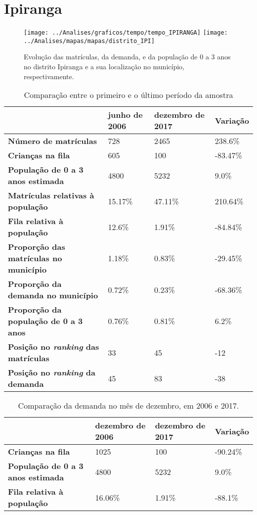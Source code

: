 \section{Ipiranga}
\begin{figure}[H]
	\centering
	\texttt{[image: ../Analises/graficos/tempo/tempo\_IPIRANGA]}
	\texttt{[image: ../Analises/mapas/mapas/distrito\_IPI]}
	\caption{Evolução das matrículas, da demanda, e da população de 0 a 3 anos no distrito Ipiranga e a sua localização no município, respectivamente.}
\end{figure}
\begin{table}[H]
	\begin{tabular}{|l|l|l|l|}
		\hline
		\textbf{}                                      & \textbf{junho de 2006}       & \textbf{dezembro de 2017}    & \textbf{Variação} \\ \hline
		\textbf{Número de matrículas}                  & 728 & 2465 & 238.6\% \\ \hline
		\textbf{Crianças na fila}                      & 605 & 100 & -83.47\% \\ \hline
		\textbf{População de 0 a 3 anos estimada}      & 4800 & 5232 & 9.0\% \\ \hline
		\textbf{Matrículas relativas à população}      & 15.17\% & 47.11\% & 210.64\% \\ \hline
		\textbf{Fila relativa à população}             & 12.6\% & 1.91\% & -84.84\% \\ \hline
		\textbf{Proporção das matrículas no município} & 1.18\% & 0.83\% & -29.45\% \\ \hline
		\textbf{Proporção da demanda no município}     & 0.72\% & 0.23\% & -68.36\% \\ \hline
		\textbf{Proporção da população de 0 a 3 anos}  & 0.76\% & 0.81\% & 6.2\% \\ \hline
		\textbf{Posição no \textit{ranking} das matrículas}     & 33 & 45 & -12 \\ \hline
		\textbf{Posição no \textit{ranking} da demanda}         & 45 & 83 & -38 \\ \hline
	\end{tabular}
	\caption{Comparação entre o primeiro e o último período da amostra}
\end{table}
\begin{table}[H]
	\begin{tabular}{|l|l|l|l|}
		\hline
		\textbf{}                                 & \textbf{dezembro de 2006} & \textbf{dezembro de 2017} & \textbf{Variação} \\ \hline
		\textbf{Crianças na fila}                      & 1025 & 100 & -90.24\% \\ \hline
		\textbf{População de 0 a 3 anos estimada}      & 4800 & 5232 & 9.0\% \\ \hline
		\textbf{Fila relativa à população}             & 16.06\% & 1.91\% & -88.1\% \\ \hline
	\end{tabular}
	\caption{Comparação da demanda no mês de dezembro, em 2006 e 2017.}
\end{table}
